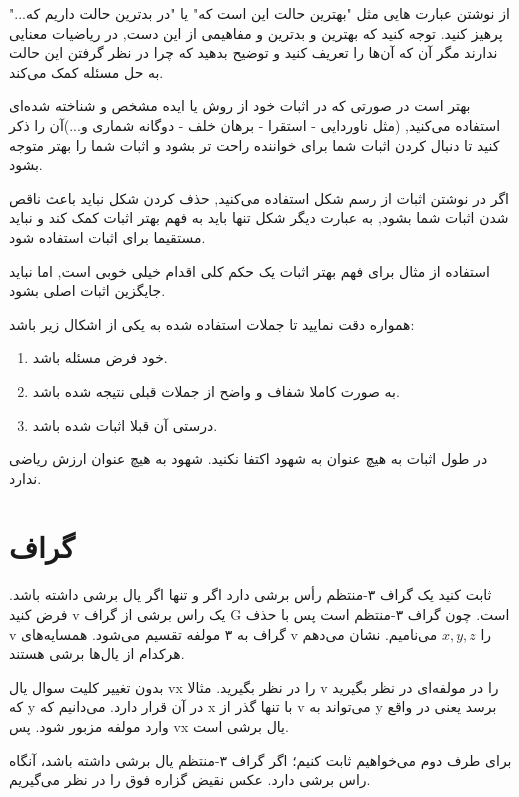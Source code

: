 \documentclass[11pt,largemargins]{h2wp}
\begin{document}
از نوشتن عبارت هایی مثل "بهترین حالت این است که" یا "در بدترین حالت داریم که..." پرهیز کنید. توجه کنید که بهترین و بدترین و مفاهیمی از این دست, در ریاضیات معنایی ندارند مگر آن که آن‌ها را تعریف کنید و توضیح بدهید که چرا در نظر گرفتن این حالت به حل مسئله کمک می‌کند.

بهتر است در صورتی که در اثبات خود از روش یا ایده مشخص و شناخته شده‌ای استفاده می‌کنید, (مثل ناوردایی - استقرا - برهان خلف - دوگانه شماری و...)آن را ذکر کنید تا دنبال کردن اثبات شما برای خواننده راحت تر بشود و اثبات شما را بهتر متوجه بشود.

اگر در نوشتن اثبات از رسم شکل استفاده می‌کنید, حذف کردن شکل نباید باعث ناقص شدن اثبات شما بشود, به عبارت دیگر شکل تنها باید به فهم بهتر اثبات کمک کند و نباید مستقیما برای اثبات استفاده شود.

استفاده از مثال برای فهم بهتر اثبات یک حکم کلی اقدام خیلی خوبی است, اما نباید جایگزین اثبات اصلی بشود.

 همواره دقت نمایید تا جملات استفاده شده به یکی از اشکال زیر باشد:

\begin{enumerate}
\item
خود فرض مسئله باشد.
\item
به صورت كاملا شفاف و واضح از جملات قبلی نتیجه شده باشد.
\item
درستی آن قبلا اثبات شده باشد.
 	 \end{enumerate}
 	 
 در طول اثبات به هیچ عنوان به شهود اکتفا نکنید. شهود به هیچ عنوان ارزش ریاضی ندارد.
 
\chapter*{گراف}

\question
    ثابت کنید یک گراف ۳-منتظم رأس برشی دارد اگر و تنها اگر یال برشی داشته‌ باشد. 
 \solution 
 فرض کنید v یک راس برشی از گراف G است. چون گراف ۳-منتظم است پس با حذف v گراف به ۳ مولفه تقسیم می‌شود. همسایه‌های v را $ x, y, z  $ می‌نامیم. نشان می‌دهم هرکدام از یال‌ها برشی هستند.
 
 بدون تغییر کلیت سوال یال vx را در نظر بگیرید. مثالا v را در مولفه‌ای در نظر بگیرید که y در آن قرار دارد. می‌دانیم که x با تنها گذر از v می‌تواند به y برسد یعنی در واقع وارد مولفه مزبور شود. پس vx یال برشی است.
 
 برای طرف دوم می‌خواهیم ثابت کنیم؛ اگر گراف ۳-منتظم یال برشی داشته باشد، آنگاه راس برشی دارد.
 عکس نقیض گزاره فوق را در نظر می‌گیریم.
 
\end{document}
